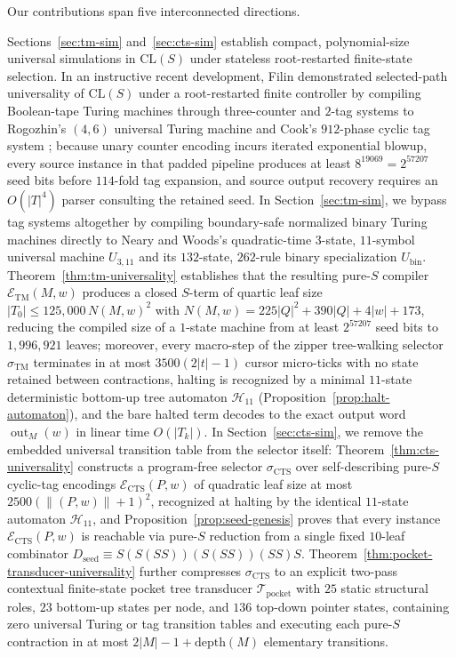 \documentclass[11pt,reqno]{amsart}
\numberwithin{equation}{section}
\theoremstyle{plain}
\theoremstyle{definition}
\theoremstyle{remark}
\DeclareMathOperator{\out}{out}
\newcommand{\CLS}{\mathrm{CL}(S)}
\begin{document}
Our contributions span five interconnected directions.

Sections~\ref{sec:tm-sim} and~\ref{sec:cts-sim} establish compact, polynomial-size universal simulations in $\CLS$ under stateless root-restarted finite-state selection. In an instructive recent development, Filin \cite{Filin2026} demonstrated selected-path universality of $\CLS$ under a root-restarted finite controller by compiling Boolean-tape Turing machines through three-counter and $2$-tag systems \cite{CockeMinsky1964Tag,Minsky1967Computation} to Rogozhin's $(4,6)$ universal Turing machine \cite{Rogozhin1996SmallUTM} and Cook's $912$-phase cyclic tag system \cite{Cook2004Rule110}; because unary counter encoding incurs iterated exponential blowup, every source instance in that padded pipeline produces at least $8^{19069} = 2^{57207}$ seed bits before $114$-fold tag expansion, and source output recovery requires an $O(|T|^4)$ parser consulting the retained seed. In Section~\ref{sec:tm-sim}, we bypass tag systems altogether by compiling boundary-safe normalized binary Turing machines directly to Neary and Woods's quadratic-time $3$-state, $11$-symbol universal machine $U_{3,11}$ \cite{NearyWoods2006SmallFast,Neary2008Thesis} and its $132$-state, $262$-rule binary specialization $U_{\mathrm{bin}}$. Theorem~\ref{thm:tm-universality} establishes that the resulting pure-$S$ compiler $\mathcal{E}_{\mathrm{TM}}(M,w)$ produces a closed $S$-term of quartic leaf size $|T_0| \le 125{,}000\,N(M,w)^2$ with $N(M,w) = 225|Q|^2 + 390|Q| + 4|w| + 173$, reducing the compiled size of a $1$-state machine from at least $2^{57207}$ seed bits to $1{,}996{,}921$ leaves; moreover, every macro-step of the zipper tree-walking selector $\sigma_{\mathrm{TM}}$ terminates in at most $3500(2|t|-1)$ cursor micro-ticks with no state retained between contractions, halting is recognized by a minimal $11$-state deterministic bottom-up tree automaton $\mathcal{H}_{11}$ (Proposition~\ref{prop:halt-automaton}), and the bare halted term decodes to the exact output word $\out_M(w)$ in linear time $O(|T_k|)$. In Section~\ref{sec:cts-sim}, we remove the embedded universal transition table from the selector itself: Theorem~\ref{thm:cts-universality} constructs a program-free selector $\sigma_{\mathrm{CTS}}$ over self-describing pure-$S$ cyclic-tag encodings $\mathcal{E}_{\mathrm{CTS}}(P,w)$ of quadratic leaf size at most $2500(\|(P,w)\|+1)^2$, recognized at halting by the identical $11$-state automaton $\mathcal{H}_{11}$, and Proposition~\ref{prop:seed-genesis} proves that every instance $\mathcal{E}_{\mathrm{CTS}}(P,w)$ is reachable via pure-$S$ reduction from a single fixed $10$-leaf combinator $D_{\mathrm{seed}} \equiv S(S(S S))(S(S S))(S S)S$. Theorem~\ref{thm:pocket-transducer-universality} further compresses $\sigma_{\mathrm{CTS}}$ to an explicit two-pass contextual finite-state pocket tree transducer $\mathcal{T}_{\mathrm{pocket}}$ with $25$ static structural roles, $23$ bottom-up states per node, and $136$ top-down pointer states, containing zero universal Turing or tag transition tables and executing each pure-$S$ contraction in at most $2|M| - 1 + \mathrm{depth}(M)$ elementary transitions.
\end{document}
